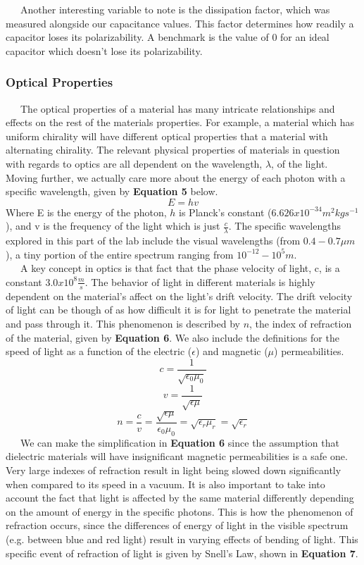 \documentclass{article}
\begin{document}
\ \ \ Another interesting variable to note is the dissipation factor, which was measured alongside our capacitance values. This factor determines how readily a capacitor loses its polarizability. A benchmark is the value of 0 for an ideal capacitor which doesn't lose its polarizability.

\subsubsection*{Optical Properties}
\ \ \ The optical properties of a material has many intricate relationships and effects on the rest of the materials properties. For example, a material which has uniform chirality will have different optical properties that a material with alternating chirality. The relevant physical properties of materials in question with regards to optics are all dependent on the wavelength, $\lambda$, of the light. Moving further, we actually care more about the energy of each photon with a specific wavelength, given by \textbf{Equation 5} below.
\begin{equation}
E = hv
\end{equation}
Where E is the energy of the photon, $h$ is Planck's constant ($6.626x10^{-34}m^2kgs^{-1}$), and v is the frequency of the light which is just $\frac{c}{\lambda}$. The specific wavelengths explored in this part of the lab include the visual wavelengths (from $0.4-0.7\mu m$), a tiny portion of the entire spectrum ranging from $10^{-12}-10^{5}m$.\\
\ \ \ A key concept in optics is that fact that the phase velocity of light, c, is a constant $3.0x10^8\frac{m}{s}$. The behavior of light in different materials is highly dependent on the material's affect on the light's drift velocity. The drift velocity of light can be though of as how difficult it is for light to penetrate the material and pass through it. This phenomenon is described by $n$, the index of refraction of the material, given by \textbf{Equation 6}. We also include the definitions for the speed of light as a function of the electric ($\epsilon$) and magnetic ($\mu$) permeabilities.
$$c = \frac{1}{\sqrt{\epsilon_0\mu_0}}$$
$$v = \frac{1}{\sqrt{\epsilon\mu}}$$
\begin{equation}
n = \frac{c}{v} = \frac{\sqrt{\epsilon\mu}}{\epsilon_0\mu_0} = \sqrt{\epsilon_r\mu_r} = \sqrt{\epsilon_r}
\end{equation}
\ \ \ We can make the simplification in \textbf{Equation 6} since the assumption that dielectric materials will have insignificant magnetic permeabilities is a safe one. Very large indexes of refraction result in light being slowed down significantly when compared to its speed in a vacuum. It is also important to take into account the fact that light is affected by the same material differently depending on the amount of energy in the specific photons. This is how the phenomenon of refraction occurs, since the differences of energy of light in the visible spectrum (e.g. between blue and red light) result in varying effects of bending of light. This specific event of refraction of light is given by Snell's Law, shown in \textbf{Equation 7}.
\end{document}
